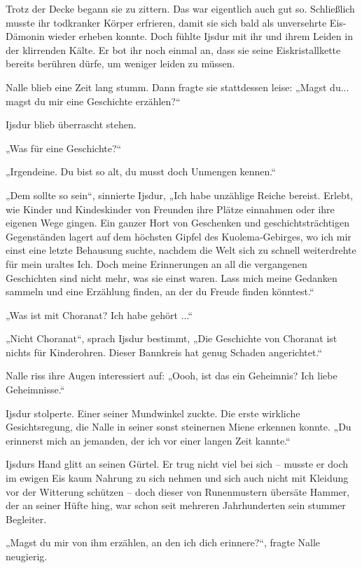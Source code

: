Trotz der Decke begann sie zu zittern. Das war eigentlich auch gut so. Schließlich musste ihr todkranker Körper erfrieren, damit sie sich bald als unversehrte Eis-Dämonin wieder erheben konnte. Doch fühlte Ijsdur mit ihr und ihrem Leiden in der klirrenden Kälte. Er bot ihr noch einmal an, dass sie seine Eiskristallkette bereits berühren dürfe, um weniger leiden zu müssen.

Nalle blieb eine Zeit lang stumm. Dann fragte sie stattdessen leise: „Magst du... magst du mir eine Geschichte erzählen?“

Ijsdur blieb überrascht stehen.

„Was für eine Geschichte?“

„Irgendeine. Du bist so alt, du musst doch Unmengen kennen.“

„Dem sollte so sein“, sinnierte Ijsdur, „Ich habe unzählige Reiche bereist. Erlebt, wie Kinder und Kindeskinder von Freunden ihre Plätze einnahmen oder ihre eigenen Wege gingen. Ein ganzer Hort von Geschenken und geschichtsträchtigen Gegenständen lagert auf dem höchsten Gipfel des Kuolema-Gebirges, wo ich mir einst eine letzte Behausung suchte, nachdem die Welt sich zu schnell weiterdrehte für mein uraltes Ich. Doch meine Erinnerungen an all die vergangenen Geschichten sind nicht mehr, was sie einst waren. Lass mich meine Gedanken sammeln und eine Erzählung finden, an der du Freude finden könntest.“

„Was ist mit Choranat? Ich habe gehört ...“

„Nicht Choranat“, sprach Ijsdur bestimmt, „Die Geschichte von Choranat ist nichts für Kinderohren. Dieser Bannkreis hat genug Schaden angerichtet.“

Nalle riss ihre Augen interessiert auf: „Oooh, ist das ein Geheimnis? Ich liebe Geheimnisse.“

Ijsdur stolperte. Einer seiner Mundwinkel zuckte. Die erste wirkliche Gesichtsregung, die Nalle in seiner sonst steinernen Miene erkennen konnte. „Du erinnerst mich an jemanden, der ich vor einer langen Zeit kannte.“

Ijsdurs Hand glitt an seinen Gürtel. Er trug nicht viel bei sich – musste er doch im ewigen Eis kaum Nahrung zu sich nehmen und sich auch nicht mit Kleidung vor der Witterung schützen – doch dieser von Runenmustern übersäte Hammer, der an seiner Hüfte hing, war schon seit mehreren Jahrhunderten sein stummer Begleiter.

„Magst du mir von ihm erzählen, an den ich dich erinnere?“, fragte Nalle neugierig.

